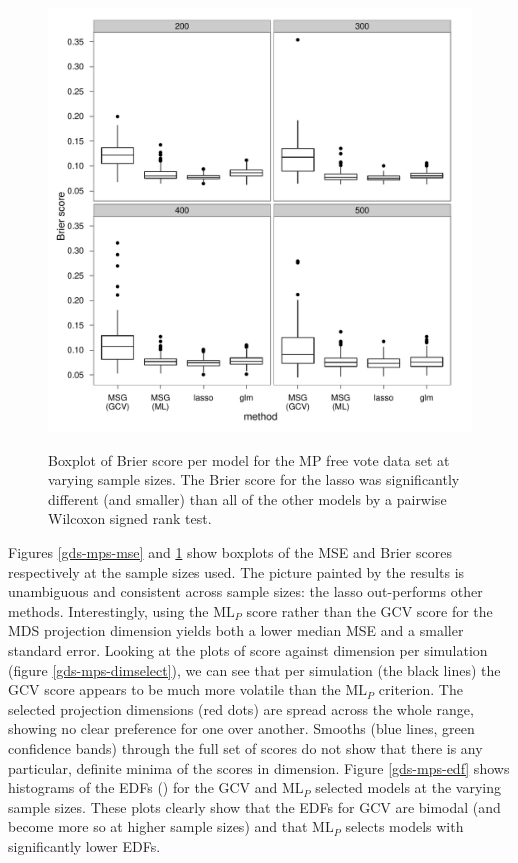 \begin{figure}
\centering
\includegraphics[width=6in]{gds/figs/mp-brier.pdf} \\
\caption{Boxplot of Brier score per model for the MP free vote data set at varying sample sizes. The Brier score for the lasso was significantly different (and smaller) than all of the other models by a pairwise Wilcoxon signed rank test.}
\label{gds-mps-brier}
\end{figure}

Figures \ref{gds-mps-mse} and \ref{gds-mps-brier} show boxplots of the MSE and Brier scores respectively at the sample sizes used. The picture painted by the results is unambiguous and consistent across sample sizes: the lasso out-performs other methods. Interestingly, using the $\text{ML}_P$ score rather than the GCV score for the MDS projection dimension yields both a lower median MSE and a smaller standard error. Looking at the plots of score against dimension per simulation (figure \ref{gds-mps-dimselect}), we can see that per simulation (the black lines) the GCV score appears to be much more volatile than the $\text{ML}_P$ criterion. The selected projection dimensions (red dots) are spread across the whole range, showing no clear preference for one over another. Smooths (blue lines, green confidence bands) through the full set of scores do not show that there is any particular, definite minima of the scores in dimension. Figure \ref{gds-mps-edf} shows histograms of the EDFs () for the GCV and $\text{ML}_P$ selected models at the varying sample sizes. These plots clearly show that the EDFs for GCV are bimodal (and become more so at higher sample sizes) and that $\text{ML}_P$ selects models with significantly lower EDFs.

